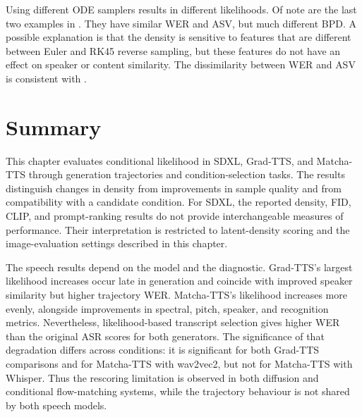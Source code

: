 Using different \ac{ODE} samplers results in different likelihoods. Of note are the last two examples in . They have similar \ac{WER} and \ac{ASV}, but much different \ac{BPD}. A possible explanation is that the density is sensitive to features that are different between Euler and RK45 reverse sampling, but these features do not have an effect on speaker or content similarity. The dissimilarity between \ac{WER} and \ac{ASV} is consistent with .


\section{Summary}
This chapter evaluates conditional likelihood in SDXL, Grad-TTS, and Matcha-TTS through generation trajectories and condition-selection tasks. The results distinguish changes in density from improvements in sample quality and from compatibility with a candidate condition. For SDXL, the reported density, \ac{FID}, CLIP, and prompt-ranking results do not provide interchangeable measures of performance. Their interpretation is restricted to latent-density scoring and the image-evaluation settings described in this chapter.

The speech results depend on the model and the diagnostic. Grad-TTS's largest likelihood increases occur late in generation and coincide with improved speaker similarity but higher trajectory \ac{WER}. Matcha-TTS's likelihood increases more evenly, alongside improvements in spectral, pitch, speaker, and recognition metrics. Nevertheless, likelihood-based transcript selection gives higher \ac{WER} than the original \ac{ASR} scores for both generators. The significance of that degradation differs across conditions: it is significant for both Grad-TTS comparisons and for Matcha-TTS with wav2vec2, but not for Matcha-TTS with Whisper. Thus the rescoring limitation is observed in both diffusion and conditional flow-matching systems, while the trajectory behaviour is not shared by both speech models.

